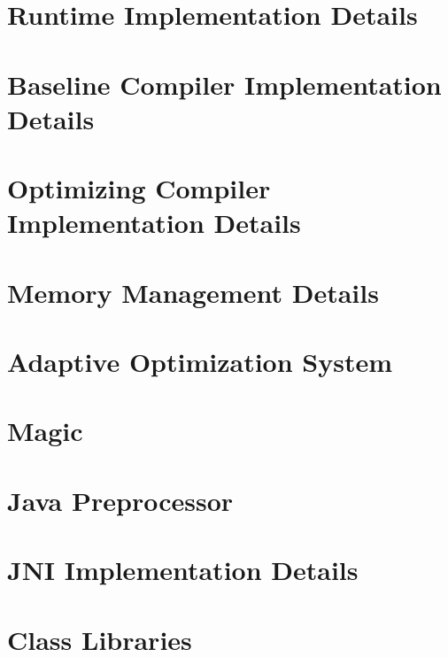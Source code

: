 \documentclass{article}
\begin{document}
\T \newpage
{}
\section{Runtime Implementation Details}


\T \newpage
{}
\section{Baseline Compiler Implementation Details}
\label{section:basedetails}


\T \newpage
{}
\section{Optimizing Compiler Implementation Details}
\label{section:optdetails}


\T \newpage
{}
\section{Memory Management Details}
\label{section:JMTk}


\T \newpage
{}
\section{Adaptive Optimization System}
\label{section:aosdetails}


\T \newpage
{}
\section{Magic}


\T \newpage
{}
\section{Java Preprocessor}
\label{section:preprocessor}


\T \newpage
{}
\section{JNI Implementation Details}
\label{section:jni}


\T \newpage
{}
\section{Class Libraries}
\label{section:libraries}

\end{document}
